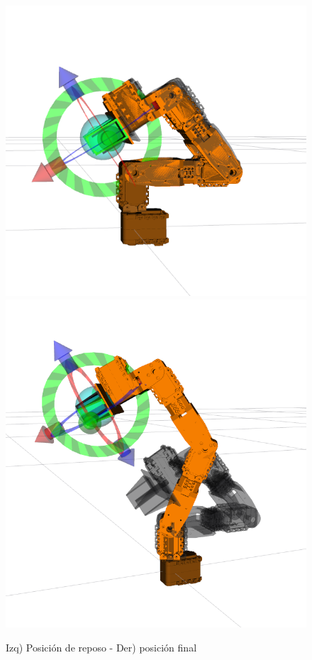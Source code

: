 \begin{figure}[ht]
    \centering
    \includegraphics[scale=0.23]{Figures/Arm_RestPos.png}           \includegraphics[scale=0.15]{Figures/Arm_MovPlan.png}
    \caption{Izq) Posición de reposo - Der) posición final}
    \label{fig:Arm_ResPos}
\end{figure}

